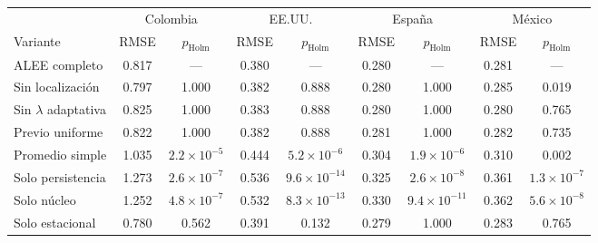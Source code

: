 \begin{tabular}{lcccccccc}
\toprule
 & \multicolumn{2}{c}{Colombia} & \multicolumn{2}{c}{EE.UU.} & \multicolumn{2}{c}{España} & \multicolumn{2}{c}{México} \\
\cmidrule(lr){2-3}\cmidrule(lr){4-5}\cmidrule(lr){6-7}\cmidrule(lr){8-9}
Variante & RMSE & $p_{\mathrm{Holm}}$ & RMSE & $p_{\mathrm{Holm}}$ & RMSE & $p_{\mathrm{Holm}}$ & RMSE & $p_{\mathrm{Holm}}$ \\
\midrule
ALEE completo & 0.817 & --- & 0.380 & --- & 0.280 & --- & 0.281 & --- \\
Sin localización & 0.797 & 1.000 & 0.382 & 0.888 & 0.280 & 1.000 & 0.285 & 0.019 \\
Sin $\lambda$ adaptativa & 0.825 & 1.000 & 0.383 & 0.888 & 0.280 & 1.000 & 0.280 & 0.765 \\
Previo uniforme & 0.822 & 1.000 & 0.382 & 0.888 & 0.281 & 1.000 & 0.282 & 0.735 \\
Promedio simple & 1.035 & $2.2\times10^{-5}$ & 0.444 & $5.2\times10^{-6}$ & 0.304 & $1.9\times10^{-6}$ & 0.310 & 0.002 \\
Solo persistencia & 1.273 & $2.6\times10^{-7}$ & 0.536 & $9.6\times10^{-14}$ & 0.325 & $2.6\times10^{-8}$ & 0.361 & $1.3\times10^{-7}$ \\
Solo núcleo & 1.252 & $4.8\times10^{-7}$ & 0.532 & $8.3\times10^{-13}$ & 0.330 & $9.4\times10^{-11}$ & 0.362 & $5.6\times10^{-8}$ \\
Solo estacional & 0.780 & 0.562 & 0.391 & 0.132 & 0.279 & 1.000 & 0.283 & 0.765 \\
\bottomrule
\end{tabular}